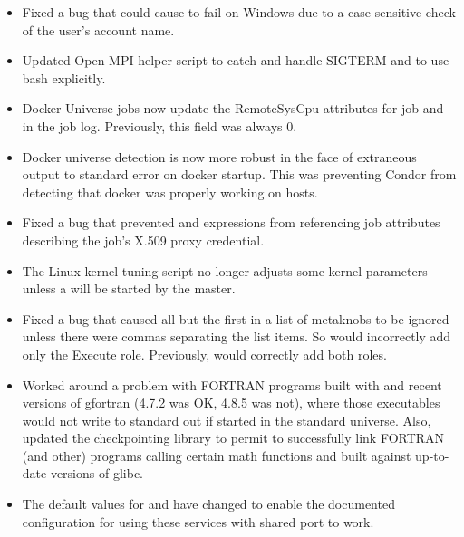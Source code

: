 \begin{itemize}

\item Fixed a bug that could cause  to fail on
Windows due to a case-sensitive check of the user's account name.

\item Updated Open MPI helper script to catch and handle SIGTERM and
to use bash explicitly.

\item Docker Universe jobs now update the RemoteSysCpu attributes for job
and in the job log. Previously, this field was always 0.

\item Docker universe detection is now more robust in the
face of extraneous output to standard error on docker startup.
This was preventing Condor from detecting that docker was properly
working on hosts.

\item Fixed a bug that prevented  and
 expressions from referencing job attributes
describing the job's X.509 proxy credential.

\item The Linux kernel tuning script no longer adjusts some kernel parameters
unless a  will be started by the master.

\item Fixed a bug that caused all but the first in a list of metaknobs to be ignored
unless there were commas separating the list items. So 
would incorrectly add only the Execute role.
Previously,  would correctly add both roles.

\item Worked around a problem with FORTRAN programs built with 
and recent versions of gfortran (4.7.2 was OK, 4.8.5 was not), where those
executables would not write to standard out if started in the standard universe.
Also, updated the checkpointing library to permit  to
successfully link FORTRAN (and other) programs calling certain math
functions and built against up-to-date versions of glibc.

\item The default values for  and
 have changed to enable the documented
configuration for using these services with shared port to work.


\end{itemize}
